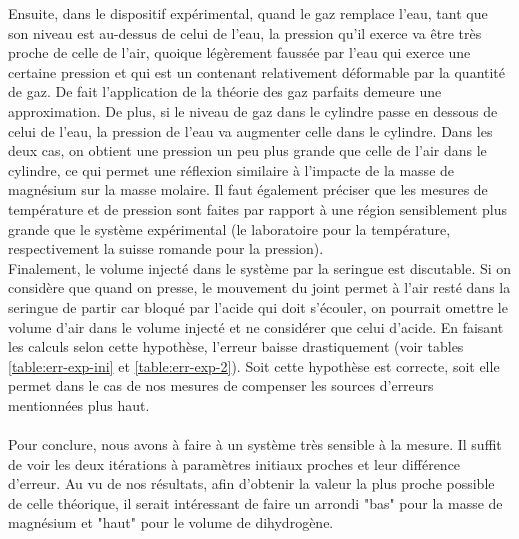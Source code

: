\documentclass[11pt]{article}
\begin{document}
Ensuite, dans le dispositif expérimental, quand le gaz remplace l'eau, tant que son niveau est au-dessus de celui de l'eau, la pression qu'il exerce va être très proche de celle de l'air, quoique légèrement faussée par l'eau qui exerce une certaine pression et qui est un contenant relativement déformable par la quantité de gaz. De fait l'application de la théorie des gaz parfaits demeure une approximation. De plus, si le niveau de gaz dans le cylindre passe en dessous de celui de l'eau, la pression de l'eau va augmenter celle dans le cylindre. Dans les deux cas, on obtient une pression un peu plus grande que celle de l'air dans le cylindre, ce qui permet une réflexion similaire à l'impacte de la masse de magnésium sur la masse molaire. Il faut également préciser que les mesures de température et de pression sont faites par rapport à une région sensiblement plus grande que le système expérimental (le laboratoire pour la température, respectivement la suisse romande pour la pression). \\
Finalement, le volume injecté dans le système par la seringue est discutable. Si on considère que quand on presse, le mouvement du joint permet à l'air resté dans la seringue de partir car bloqué par l'acide qui doit s'écouler, on pourrait omettre le volume d'air dans le volume injecté et ne considérer que celui d'acide. En faisant les calculs selon cette hypothèse, l'erreur baisse drastiquement (voir tables \ref{table:err-exp-ini} et \ref{table:err-exp-2}). Soit cette hypothèse est correcte, soit elle permet dans le cas de nos mesures de compenser les sources d'erreurs mentionnées plus haut. \\ \\
Pour conclure, nous avons à faire à un système très sensible à la mesure. Il suffit de voir les deux itérations à paramètres initiaux proches et leur différence d'erreur. Au vu de nos résultats, afin d'obtenir la valeur la plus proche possible de celle théorique, il serait intéressant de faire un arrondi "bas" pour la masse de magnésium et "haut" pour le volume de dihydrogène.
\end{document}
